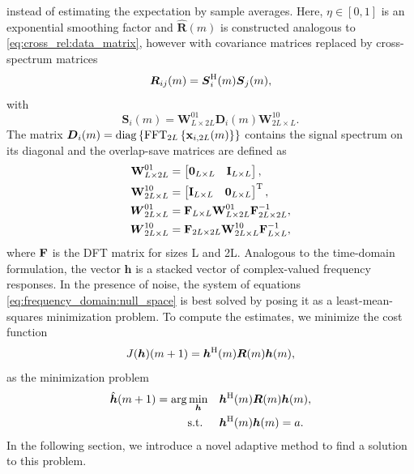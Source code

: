 \documentclass{article}
\newcommand{\x}{\mtxb{x}}
\newcommand{\hf}{{\bm{h}}}
\newcommand{\Rf}{{\bm{{R}}}}
\begin{document}
instead of estimating the expectation by sample averages. Here, \(\eta \in [0,1]\) is an exponential smoothing factor and \(\hat{\Rf}(m)\) is constructed analogous to \eqref{eq:cross_rel:data_matrix}, however with covariance matrices replaced by cross-spectrum matrices 
\begin{equation}
    \Rf_{ij}(m) = \bm{{S}}_{i}^\herm (m) \bm{{S}}_{j}(m),
\end{equation}
with 
\begin{equation}
    \bm{{S}}_{i}(m) = \bm{{W}}^{01}_{L \times 2L} \bm{{D}}_{i}(m) \bm{{W}}^{10}_{2L \times L}.
\end{equation}
The matrix \(\bm{{D}}_{i}(m) = \operatorname{diag} \left\{ \operatorname{FFT}_{2L} \left\{ \x_{i,2L}(m) \right\} \right\}\) contains the  signal spectrum on its diagonal and the overlap-save matrices are defined as
\begin{align}
    \bm{\mathrm{W}}_{L \times 2L}^{01} &= \begin{bmatrix}
        \bm{\mathrm{0}}_{L \times L} & \bm{\mathrm{I}}_{L \times L}
    \end{bmatrix},\\
    \bm{\mathrm{W}}_{2L \times L}^{10} &= \begin{bmatrix}
        \bm{\mathrm{I}}_{L \times L} & \bm{\mathrm{0}}_{L \times L}
    \end{bmatrix}^{\mathrm{T}},\\
    \bm{{W}}_{2L \times L}^{01} &= \bm{\mathrm{F}}_{L \times L} \bm{\mathrm{W}}_{L \times 2L}^{01} \bm{\mathrm{F}}_{2L \times 2L}^{-1},\\
    \bm{{W}}_{2L \times L}^{10} &= \bm{\mathrm{F}}_{2L \times 2L} \bm{\mathrm{W}}_{2L \times L}^{10} \bm{\mathrm{F}}_{L \times L}^{-1},
\end{align} where $\bm{\mathrm{F}}$ is the DFT matrix for sizes L and 2L.
Analogous to the time-domain formulation, the vector \(\hf\) is a stacked vector of complex-valued frequency responses.
In the presence of noise, the system of equations \eqref{eq:frequency_domain:null_space} is best solved by posing it as a least-mean-squares minimization problem.
To compute the estimates, we minimize the cost function
\begin{equation}
    J(\hf)(m+1) = \hf^\herm(m) \Rf(m) \hf(m),\label{eq:frequency_domain:cost_function}
\end{equation}
as the minimization problem
\begin{align}
    \hat{\hf}(m+1) = \arg \min_{\hf} \quad &\hf^\herm(m) \Rf(m) \hf(m), \label{eq:frequency_domain:min_prob}\\
    \text{s.t. } \quad &\hf^\herm(m) \hf(m) = a.
\end{align}
In the following section, we introduce a novel adaptive method to find a solution to this problem.
\end{document}
